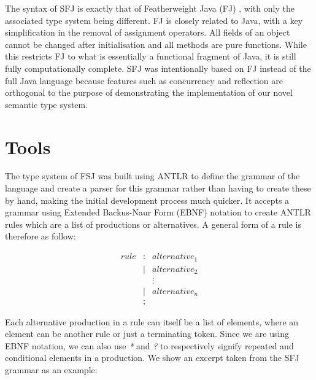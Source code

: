 \documentclass{l4proj}
\begin{document}
The syntax of SFJ is exactly that of Featherweight Java (FJ) \citep{Igarashi1999}, with only the associated type system being different.
FJ is closely related to Java, with a key simplification in the removal of assignment operators.
All fields of an object cannot be changed after initialisation and all methods are pure functions.
While this restricts FJ to what is essentially a functional fragment of Java, it is still fully computationally complete.
SFJ was intentionally based on FJ instead of the full Java language because features such as concurrency and reflection are orthogonal to the purpose of demonstrating the implementation of our novel semantic type system.

\section{Tools}

The type system of FSJ was built using ANTLR \citep{parr2013} to define the grammar of the language and create a parser for this grammar rather than having to create these by hand, making the initial development process much quicker.
It accepts a grammar using Extended Backus-Naur Form (EBNF) notation to create ANTLR rules which are a list of productions or alternatives. A general form of a rule is therefore as follow:

$$
    \begin{array}{llll}
        rule & : & alternative_{1}
        \\
             & | & alternative_{2}
        \\
             &   & \vdots
        \\
             & | & alternative_{n}
        \\
             & ; & 
    \end{array}
$$

Each alternative production in a rule can itself be a list of elements, where an element can be another rule or just a terminating token. Since we are using EBNF notation, we can also use \emph{*} and \emph{?} to respectively signify repeated and conditional elements in a production. We show an excerpt taken from the SFJ grammar as an example:
\end{document}
